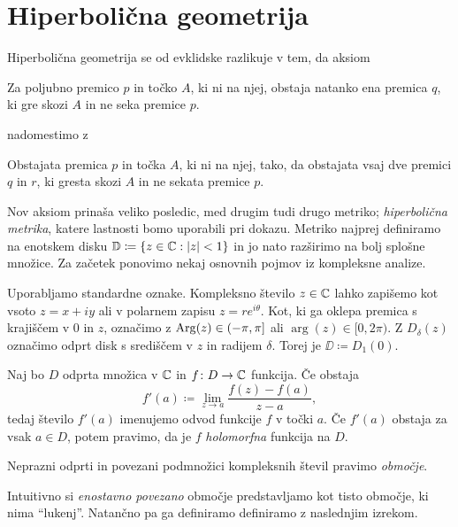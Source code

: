 \section{Hiperbolična geometrija} \label{sec:hipgeom}

Hiperbolična geometrija se od evklidske razlikuje v tem, da aksiom

\begin{aksiom}
    Za poljubno premico \(p\) in točko \(A\), ki ni na njej, obstaja natanko ena premica \(q\), ki gre skozi \(A\) in ne seka premice \(p\).
\end{aksiom}

\noindent nadomestimo z

\begin{aksiom}
    Obstajata premica \(p\) in točka \(A\), ki ni na njej, tako, da obstajata vsaj dve premici \(q\) in \(r\), ki gresta skozi \(A\) in ne sekata premice \(p\).
\end{aksiom}

\noindent Nov aksiom prinaša veliko posledic, med drugim tudi drugo metriko; \emph{hiperbolična metrika}, katere lastnosti bomo uporabili pri dokazu. Metriko najprej definiramo na enotskem disku \(\mathbb D \coloneq \left\{ z \in \mathbb C : |z| < 1 \right\}\) in jo nato razširimo na bolj splošne množice. Za začetek ponovimo nekaj osnovnih pojmov iz kompleksne analize.

Uporabljamo standardne oznake. Kompleksno število \(z \in \mathbb C\) lahko zapišemo kot vsoto \(z = x + i y\) ali v polarnem zapisu \(z = r e^{i \theta}\). Kot, ki ga oklepa premica s krajiščem v \(0\) in \(z\), označimo z \(\operatorname{Arg} (z) \in (- \pi, \pi]\) ali \(\arg (z) \in [0, 2 \pi)\). Z \(D_{\delta} (z)\) označimo odprt disk s središčem v \(z\) in radijem \(\delta\). Torej je \(\DD \coloneq D_1 (0)\).

\begin{definicija}
    Naj bo \(D\) odprta množica v \(\mathbb C\) in \(f \colon D \to \mathbb C\) funkcija. Če obstaja
    \[f' (a) \coloneq \lim_{z \to a} \frac{f (z) - f (a)}{z - a},\]
    tedaj število \(f' (a)\) imenujemo odvod funkcije \(f\) v točki \(a\). Če \(f' (a)\) obstaja za vsak \(a \in D\), potem pravimo, da je \(f\) \emph{holomorfna} funkcija na \(D\).
\end{definicija}

\begin{definicija}
    Neprazni odprti in povezani podmnožici kompleksnih števil pravimo \emph{območje}.
\end{definicija}

\noindent Intuitivno si \emph{enostavno povezano} območje predstavljamo kot tisto območje, ki nima ``lukenj''. Natančno pa ga definiramo definiramo z naslednjim izrekom.

